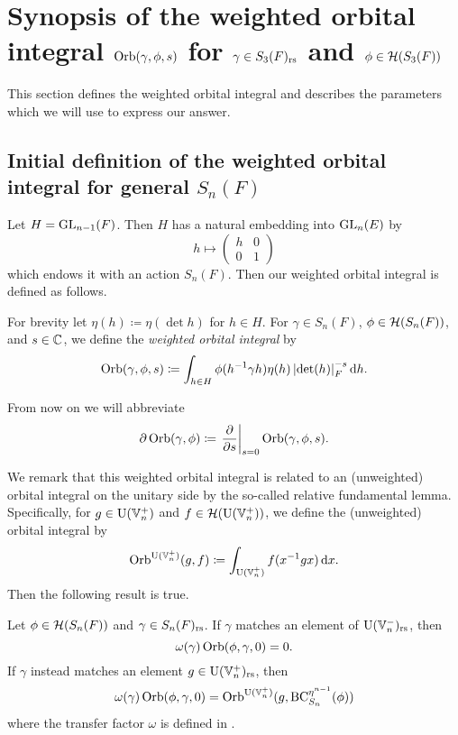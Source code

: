 \chapter{Synopsis of the weighted orbital integral $\operatorname{Orb}(\gamma, \phi, s)$ for $\gamma \in S_3(F)_{\mathrm{rs}}$ and $\phi \in \mathcal H(S_3(F))$}
\label{ch:orbital0}

This section defines the weighted orbital integral
and describes the parameters which we will use to express our answer.

\section{Initial definition of the weighted orbital integral for general $S_n(F)$}
Let $H = \operatorname{GL}_{n-1}(F)$.
Then $H$ has a natural embedding into $\operatorname{GL}_n(E)$ by
\[ h \mapsto \begin{pmatrix} h & 0 \\ 0 & 1 \end{pmatrix} \]
which endows it with an action $S_n(F)$.
Then our weighted orbital integral is defined as follows.
\begin{definition}
  \label{def:orbital0}
  For brevity let $\eta(h) \coloneqq \eta(\det h)$ for $h \in H$.
  For $\gamma \in S_n(F)$, $\phi \in \mathcal H(S_n(F))$, and $s \in \mathbb C$,
  we define the \emph{weighted orbital integral} by
  \[ \Orb(\gamma, \phi, s) \coloneqq
    \int_{h \in H} \phi(h\inv \gamma h) \eta(h)
    \left\lvert \det(h) \right\rvert_F^{-s} \odif h. \]
\end{definition}
\begin{definition}
  From now on we will abbreviate
  \[ \partial \operatorname{Orb}(\gamma, \phi)
    \coloneqq \left. \pdv{}{s} \right\rvert_{s=0} \operatorname{Orb}(\gamma, \phi, s). \]
\end{definition}


We remark that this weighted orbital integral is related to
an (unweighted) orbital integral on the unitary side
by the so-called relative fundamental lemma.
Specifically, for $g \in \operatorname{U}(\mathbb V_n^+)$ and $f \in \mathcal H(\operatorname{U}(\mathbb V_n^+))$,
we define the (unweighted) orbital integral by
\[ \Orb^{\U(\VV_n^+)}(g, f) \coloneqq \int_{\U(\VV_n^+)} f(x^{-1}gx) \odif x. \]
Then the following result is true.
\begin{theorem}
  \label{thm:rel_fundamental_lemma}
  Let $\phi \in \mathcal H(S_n(F))$ and $\gamma \in S_n(F)_{\mathrm{rs}}$.
  If $\gamma$ matches an element of $\operatorname{U}(\mathbb V_n^-)_{\mathrm{rs}}$, then
  \[ \omega(\gamma) \operatorname{Orb}(\phi, \gamma, 0) = 0. \]
  If $\gamma$ instead matches an element $g \in \operatorname{U}(\mathbb V_n^+)_{\mathrm{rs}}$, then
  \[ \omega(\gamma) \operatorname{Orb}(\phi, \gamma, 0)
    = \operatorname{Orb}^{\operatorname{U}(\mathbb V_n^+)}(g, \operatorname{BC}^{\eta^{n-1}}_{S_n}(\phi)) \]
  where the transfer factor $\omega$ is defined in .
\end{theorem}

